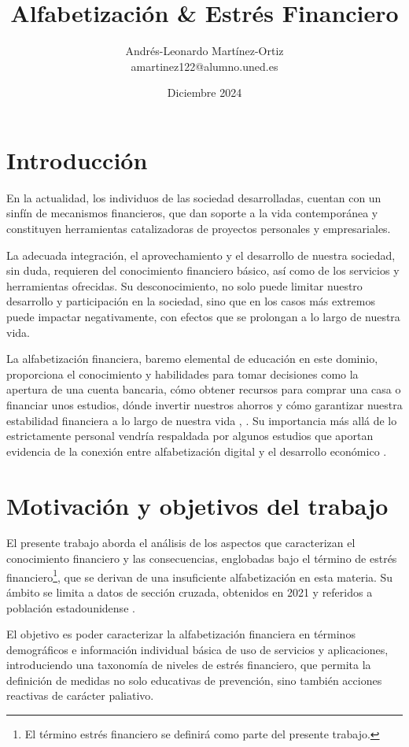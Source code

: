 \documentclass[a4paper, 11pt]{article}
\title{Alfabetización \& Estrés Financiero}
\author{Andrés-Leonardo Martínez-Ortiz \\ amartinez122@alumno.uned.es}
\date{Diciembre 2024}
\begin{document}
\maketitle

\section{Introducción}
\label{sec:introduction}
En la actualidad, los individuos de las sociedad desarrolladas, cuentan con 
un sinfín de mecanismos financieros, que dan soporte a la vida contemporánea
y constituyen herramientas catalizadoras de proyectos personales y empresariales. 

La adecuada integración, el aprovechamiento y el desarrollo de
nuestra sociedad, sin duda, requieren del conocimiento financiero básico, así como
de los servicios y herramientas ofrecidas. Su desconocimiento, no solo puede limitar
nuestro desarrollo y participación en la sociedad, sino que en los casos más extremos
puede impactar negativamente, con efectos que se prolongan a lo largo de nuestra
vida. 

La alfabetización financiera, baremo elemental de educación en este dominio, 
proporciona el conocimiento y habilidades para tomar decisiones como la 
apertura de una cuenta bancaria, cómo obtener recursos para comprar una
casa o financiar unos estudios, dónde invertir nuestros ahorros y cómo 
garantizar nuestra estabilidad financiera a lo largo de nuestra vida
\cite{EU01}, \cite{OCDE01}. Su importancia más allá de lo estrictamente personal 
vendría respaldada por algunos estudios que aportan evidencia de
la conexión entre alfabetización digital y el desarrollo económico \cite{Lusardi14}. 

\section{Motivación y objetivos del trabajo}
\label{sec:motivation}
El presente trabajo aborda el análisis de los aspectos que caracterizan el conocimiento
financiero y las consecuencias, englobadas bajo el término de estrés 
financiero\footnote{El término estrés financiero se definirá como parte del presente 
trabajo.}, que se derivan de una insuficiente alfabetización en esta materia. Su ámbito se 
limita a datos de sección cruzada, obtenidos en 2021 y referidos a población estadounidense 
\cite{NFCS01}.

El objetivo es poder caracterizar la alfabetización financiera en términos demográficos e 
información individual básica de uso de servicios y aplicaciones, introduciendo una taxonomía 
de niveles de estrés financiero, que permita la definición de medidas no solo educativas de 
prevención, sino también acciones reactivas de carácter paliativo.
\end{document}
